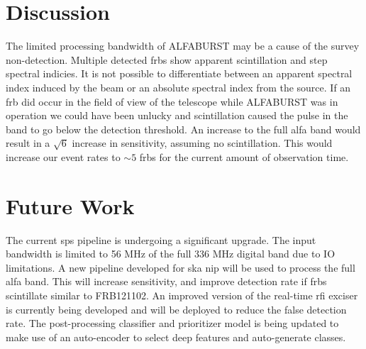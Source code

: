 \documentclass[a4paper,fleqn,usenatbib]{mnras}
\begin{document}
\section{Discussion}
\label{sec:discuss}





The limited processing bandwidth of ALFABURST may be a cause of the survey
non-detection. Multiple detected \glspl{frb} show apparent scintillation and
step spectral indicies. It is not possible to differentiate between an
apparent spectral index induced by the beam or an absolute spectral index from
the source. If an \gls{frb} did occur in the field of view of the telescope
while ALFABURST was in operation we could have been unlucky and scintillation
caused the pulse in the band to go below the detection threshold. An increase to
the full \gls{alfa} band would result in a $\sqrt{6}$ increase in sensitivity,
assuming no scintillation. This would increase our event rates to $\sim 5$
\glspl{frb} for the current amount of observation time.

\section{Future Work}
\label{sec:future_work}


The current \gls*{sps} pipeline is undergoing a significant upgrade. The input
bandwidth is limited to 56 MHz of the full 336 MHz digital band due to IO
limitations. A new pipeline developed for \gls*{ska} \gls*{nip} will be used to
process the full \gls*{alfa} band. This will increase sensitivity, and improve
detection rate if \glspl*{frb} scintillate similar to FRB121102. An improved
version of the real-time \gls*{rfi} exciser is currently being developed and
will be deployed to reduce the false detection rate. The post-processing
classifier and prioritizer model is being updated to make use of an auto-encoder
to select deep features and auto-generate classes.
\end{document}
